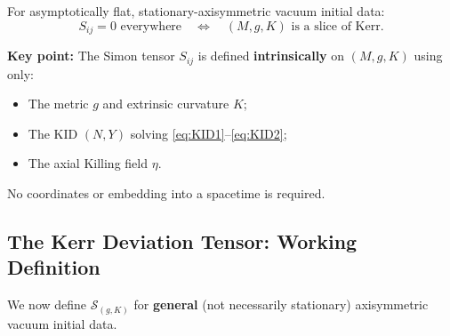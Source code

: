\begin{theorem}\label{thm:simon-kerr}
For asymptotically flat, stationary-axisymmetric vacuum initial data:
\[
S_{ij} = 0 \text{ everywhere} \quad \Longleftrightarrow \quad (M, g, K) \text{ is a slice of Kerr}.
\]
\end{theorem}

\textbf{Key point:} The Simon tensor $S_{ij}$ is defined \textbf{intrinsically} on $(M, g, K)$ using only:
\begin{itemize}
    \item The metric $g$ and extrinsic curvature $K$;
    \item The KID $(N, Y)$ solving \eqref{eq:KID1}--\eqref{eq:KID2};
    \item The axial Killing field $\eta$.
\end{itemize}
No coordinates or embedding into a spacetime is required.

\subsection{The Kerr Deviation Tensor: Working Definition}

We now define $\mathcal{S}_{(g,K)}$ for \textbf{general} (not necessarily stationary) axisymmetric vacuum initial data.

